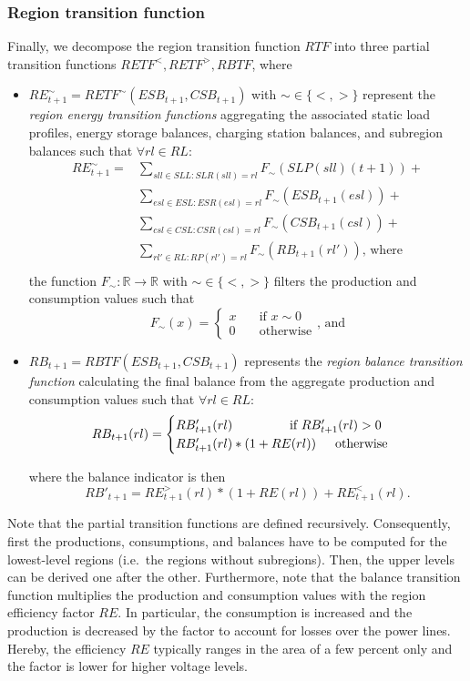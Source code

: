\subsubsection{Region transition function}
\label{transitions_regions}

Finally, we decompose the region transition function $RTF$ into three partial transition functions $RETF^<,RETF^>,RBTF$, where
\begin{itemize}
	\item $RE_{t+1}^\sim = RETF^\sim(ESB_{t+1}, CSB_{t+1})$ with $\sim \in \{<,>\}$ represent the \textit{region energy transition functions} aggregating the associated static load profiles, energy storage balances, charging station balances, and subregion balances such that $\forall rl \in RL:$
		\begin{equation*}
		\begin{split}
		RE_{t+1}^\sim = & \sum_{sll \in SLL: SLR(sll) = rl} F_\sim(SLP(sll)(t+1)) + \\
		& \sum_{esl \in ESL: ESR(esl) = rl} F_\sim(ESB_{t+1}(esl)) + \\
		& \sum_{csl \in CSL: CSR(csl) = rl} F_\sim(CSB_{t+1}(csl)) + \\
		& \sum_{rl' \in RL: RP(rl') = rl} F_\sim(RB_{t+1}(rl')) \textrm{, where} \\
		\end{split}
		\end{equation*}
	the function $F_\sim: \mathbb{R} \rightarrow \mathbb{R}$ with $\sim \in \{<,>\}$ filters the production and consumption values such that
	\[
		F_\sim(x) = \begin{cases}
			x & \quad \textrm{if } x \sim 0 \\
			0 & \quad \textrm{otherwise}
		\end{cases}
		\textrm{, and}
	\]
	\item $RB_{t+1} = RBTF(ESB_{t+1}, CSB_{t+1})$ represents the \textit{region balance transition function} calculating the final balance from the aggregate production and consumption values such that $\forall rl \in RL:$
	\[
		RB_{t+1}(rl) = \begin{cases}
		RB'_{t+1}(rl) \qquad \qquad \enskip \textrm{if } RB'_{t+1}(rl) > 0 \\
		RB'_{t+1}(rl) * (1 + RE(rl)) \enskip \quad \textrm{otherwise}
		\end{cases}
	\]
	
	where the balance indicator is then	
	\[
		RB'_{t+1} =	RE_{t+1}^>(rl) * (1 + RE(rl)) + RE_{t+1}^<(rl) \mathrm{.}
	\]	
\end{itemize}
Note that the partial transition functions are defined recursively. Consequently, first the productions, consumptions, and balances have to be computed for the lowest-level regions (i.e.\ the regions without subregions). Then, the upper levels can be derived one after the other. Furthermore, note that the balance transition function multiplies the production and consumption values with the region efficiency factor $RE$. In particular, the consumption is increased and the production is decreased by the factor to account for losses over the power lines. Hereby, the efficiency $RE$ typically ranges in the area of a few percent only and the factor is lower for higher voltage levels.